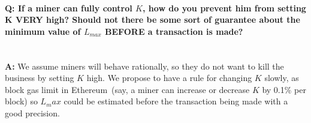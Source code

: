 \documentclass[]{llncs}   %
\begin{document}
\paragraph{\textbf{Q: } If a miner can fully control $K$, how do you prevent him from setting K VERY high? Should not there be some sort of guarantee about the minimum value of $L_{max}$ BEFORE a transaction is made?}~\\
\textbf{A: } We assume miners will behave rationally, so they do not want to kill the business by setting $K$ high. We propose to have a rule for changing $K$ slowly, as block gas limit in Ethereum~(say, a miner can increase or decrease $K$ by 0.1\% per block) so $L_max$ could be estimated before the transaction being made with a good precision.
\end{document}
